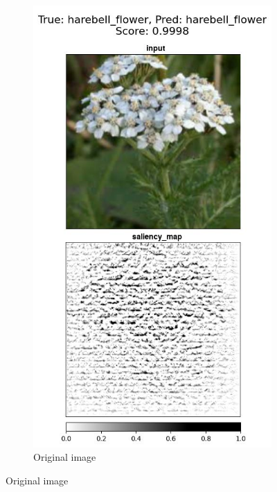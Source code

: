 \vspace{-1.5\baselineskip}
\begin{figure}
 \centering
 \begin{subfigure}{.18\textwidth}
    \centering
    \includegraphics[width=\textwidth]{results/augment-img/20-0-64-rotation-0-harebell_flower-harebell_flower_vert.jpg}
    \caption{Original image}\label{fig:original-harebell}

\end{subfigure}
\end{figure}

